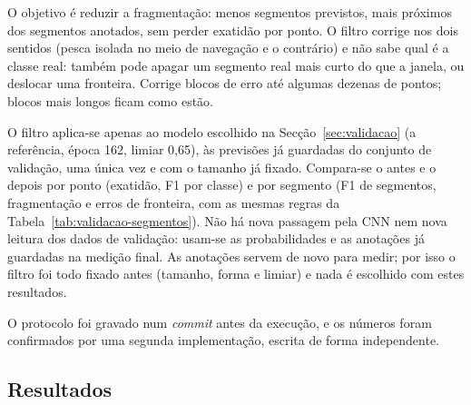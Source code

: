 \documentclass{article}
\newcommand{\revtext}[2]{{\color{#1}#2}}
\begin{document}
\revtext{rev056}{O objetivo é reduzir a fragmentação: menos segmentos previstos, mais próximos dos segmentos anotados, sem perder exatidão por ponto. O filtro corrige nos dois sentidos (pesca isolada no meio de navegação e o contrário) e não sabe qual é a classe real: também pode apagar um segmento real mais curto do que a janela, ou deslocar uma fronteira. \revtext{rev059}{Corrige blocos de erro até algumas dezenas de pontos; blocos mais longos ficam como estão.}

O filtro aplica-se apenas ao modelo escolhido na Secção~\ref{sec:validacao} (a referência, época 162, limiar 0,65), às previsões já guardadas do conjunto de validação, uma única vez e com o tamanho já fixado. Compara-se o antes e o depois por ponto (exatidão, F1 por classe) e por segmento (F1 de segmentos, fragmentação e erros de fronteira, com as mesmas regras da Tabela~\ref{tab:validacao-segmentos}). Não há nova passagem pela CNN nem nova leitura dos dados de validação: usam-se as probabilidades e as anotações já guardadas na medição final. As anotações servem de novo para medir; por isso o filtro foi todo fixado antes (tamanho, forma e limiar) e nada é escolhido com estes resultados.} \revtext{rev057}{O protocolo foi gravado num \emph{commit} antes da execução, e os números foram confirmados por uma segunda implementação, escrita de forma independente.}

\subsection{\texorpdfstring{\revtext{rev057}{Resultados}}{Resultados}}
\label{sec:posproc-resultados}
\end{document}
